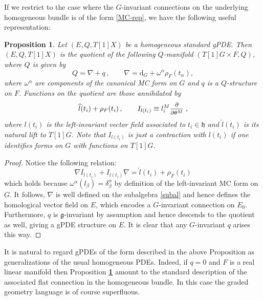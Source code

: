 \documentclass[a4paper,12pt]{article}
\numberwithin{equation}{section} %
\newtheorem{prop}[thm]{Proposition}
\renewcommand{\hat}{\widehat}
\newcommand{\bref}[1]{\textbf{\ref{#1}}}
\renewcommand{\d}{\partial}
\newcommand{\ffrac}[2]{\raisebox{.5pt}%
  {\footnotesize$\displaystyle\frac{#1}{#2}$}\kern1pt}
\newcommand{\dl}[1]{\mathchoice{\ffrac{\d}{\d #1}}{\frac{\d}{\d #1}}{\ffrac{\d}{\d #1}}{\ffrac{\d}{\d #1}}}
\newcommand{\Liealg}{\mathfrak}
\newcommand{\algg}{\Liealg{g}}
\newcommand{\algh}{\Liealg{h}}
\begin{document}
If we restrict to the case where the $G$-invariant connections on the underlying homogeneous bundle is of the form \eqref{MC-rep}, we have the following useful representation: 
\begin{prop}\label{homgpde}
Let $(E,Q,T[1]X)$ be a homogeneous standard gPDE. Then $(E,Q,T[1]X)$ is the quotient of the following  $Q$-manifold $(T[1]G \times F,Q)$, where $Q$ is given by
\begin{equation}
Q=\nabla+q\,, \qquad \nabla=\mathrm{d}_G+\omega^\alpha \rho_F(t_\alpha),
\end{equation}
where $\omega^\alpha$ are components of the canonical  MC form on $G$ and $q$ is a $Q$-structure on $F$.  Functions on the quotient are those annihilated by 
\begin{equation}
\label{subal}
 \hat l(t_i)+\rho_F(t_i)\,,\qquad  I_{l(t_i)}\equiv l^M_i\dl{\theta^M}\,,
\end{equation}
where $l(t_i)$ is the left-invariant vector field associated to $t_i\in \algh$ and $\hat l(t_i)$ is its natural lift to $T[1]G$.  Note that $I_{l(t_i)}$ is just a contraction with $l(t_i)$ if one identifies forms on $G$ with functions on $T[1]G$.
\end{prop}
\begin{proof}
Notice the following relation:
\begin{equation}
\nabla I_{l(t_i)}+I_{l(t_i)} \nabla  =\hat l(t_i)+\rho_F(t_i)
\end{equation}
which holds because $\omega^{\alpha}(l_\beta)=\delta^\alpha_\beta$ by definition of the left-invariant MC form on $G$. It follows, $\nabla$ is well defined on the subalgebra \eqref{subal} and hence defines the homological vector field on $E$, which encodes a $G$-invariant connection on $E_0$. Furthermore, $q$ is $\algg$-invariant by assumption and hence descends to the quotient as well, giving a gPDE
structure on $E$. It is clear that any $G$-invariant $q$ arises this way.
\end{proof}

It is natural to regard gPDEs of the form described in the above Proposition as generalizations of the usual homogeneous PDEs. Indeed, if $q=0$ and $F$ is a real linear manifold then Proposition \bref{homgpde}
amount to the standard description of the associated flat connection in the homogeneous bundle. In this case the graded geometry language is of course superfluous.
\end{document}
